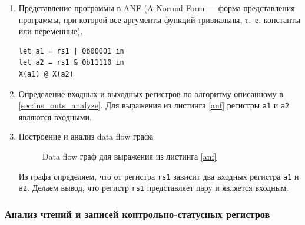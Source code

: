 \begin{enumerate}
  \item Представление программы в ANF \cite{flanagan1993essence} (A-Normal Form --- форма представления программы, при которой все аргументы функций тривиальны, т.~е. константы или переменные).
        \begin{lstlisting}[caption={ANF выражения из листинга \ref{read_op}}, language=sail, label=anf]
let a1 = rs1 | 0b00001 in
let a2 = rs1 & 0b11110 in
X(a1) @ X(a2)
        \end{lstlisting}
  \item Определение входных и выходных регистров по алгоритму описанному в \ref{sec:ins_outs_analyze}. Для выражения из листинга \ref{anf} регистры \texttt{a1} и \texttt{a2} являются входными.
  \item Построение и анализ data flow графа \cite{allen1976program}
        \begin{figure}[H]
          \centering
          \caption{Data flow граф для выражения из листинга \ref{anf}}
        \end{figure}
        Из графа определяем, что от регистра \texttt{rs1} зависит два входных регистра \texttt{a1} и \texttt{a2}. Делаем вывод, что регистр \texttt{rs1} представляет пару и является входным.
\end{enumerate}

\subsubsection{Анализ чтений и записей контрольно-статусных регистров}

